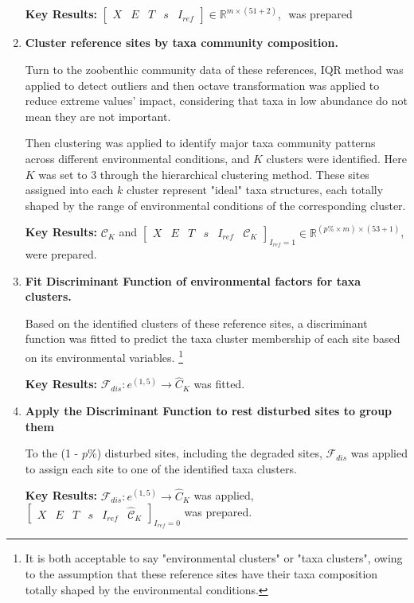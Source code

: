 \begin{enumerate}
\textbf{Key Results:} \(\left[
\begin{array}{ccccc}
X & E & T & s & I_{ref}
\end{array}
\right]
\in
\mathbb{R}^{m \times (51 + 2)}\), \(\) was prepared

\item \textbf{Cluster reference sites by taxa community composition.}

Turn to the zoobenthic community data of these references, IQR method was applied to detect outliers
and then octave transformation was applied to reduce extreme values' impact, 
considering that taxa in low abundance do not mean they are not important.

Then clustering was applied to identify major taxa community patterns across different environmental conditions,
and \(K\) clusters were identified. Here \(K\) was set to 3 through the hierarchical clustering method.
These sites assigned into each \(k\) cluster represent "ideal" taxa structures,
each totally shaped by the range of environmental conditions of the corresponding cluster.

\textbf{Key Results:} 
\(\mathcal{C}_K\)
and
\(\left[
\begin{array}{cccccc}
X & E & T & s & I_{ref} & \mathcal{C}_K
\end{array}
\right]_{I_{ref} = 1}
\in
\mathbb{R}^{(p\% \times m) \times (53 + 1)}\), were prepared.

\item \textbf{Fit Discriminant Function of environmental factors for taxa clusters.}

Based on the identified clusters of these reference sites,
a discriminant function was fitted to predict the taxa cluster membership of each site based on its environmental variables.
\footnote{It is both acceptable to say "environmental clusters" or "taxa clusters", owing to the assumption that 
these reference sites have their taxa composition totally shaped by the environmental conditions.} 

\textbf{Key Results:} 
\(\mathcal{F}_{dis}: e^{(1, 5)} \to \hat C_K\) was fitted.

\item \textbf{Apply the Discriminant Function to rest disturbed sites to group them}

To the (1 - \(p\%\)) disturbed sites, including the degraded sites, 
\(\mathcal{F}_{dis}\) was applied to assign each site to one of the identified taxa clusters.

\textbf{Key Results:} 
\(\mathcal{F}_{dis}: e^{(1, 5)} \to \hat C_K\) was applied, 
\(\left[
\begin{array}{cccccc}
X & E & T & s & I_{ref} & \mathcal{\hat C}_K
\end{array}
\right]_{I_{ref} = 0}\) was prepared.


\end{enumerate}
